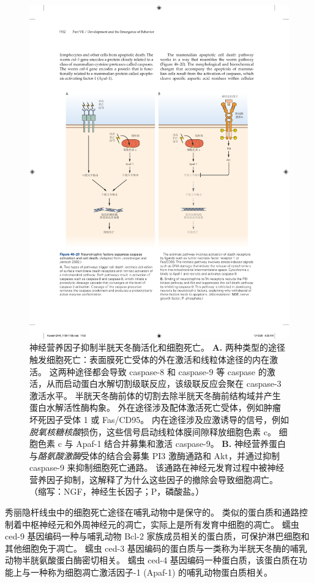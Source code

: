 \begin{figure}[htbp]
	\centering
	\includegraphics[width=0.9\linewidth]{chap46/fig_46_20}
	\caption{神经营养因子抑制半胱天冬酶活化和细胞死亡\cite{jesenberger2002deadly}。
		\textbf{A.} 两种类型的途径触发细胞死亡：表面膜死亡受体的外在激活和线粒体途径的内在激活。
		这两种途径都会导致 caspase-8 和 caspase-9 等 caspase 的激活，从而启动蛋白水解切割级联反应，该级联反应会聚在 caspase-3 激活水平。
		半胱天冬酶前体的切割去除半胱天冬酶前结构域并产生蛋白水解活性酶构象。
		外在途径涉及配体激活死亡受体，例如肿瘤坏死因子受体 1 或 Fas/CD95。
		内在途径涉及应激诱导的信号，例如\textit{脱氧核糖核酸}损伤，这些信号启动线粒体膜间隙释放细胞色素 c。
		细胞色素 c 与 Apaf-1 结合并募集和激活 caspase-9。
		\textbf{B.} 神经营养蛋白与\textit{酪氨酸激酶}受体的结合会募集 PI3 激酶通路和 Akt，并通过抑制 caspase-9 来抑制细胞死亡通路。
		该通路在神经元发育过程中被神经营养因子抑制，这解释了为什么这些因子的撤除会导致细胞凋亡。
		（缩写：NGF，神经生长因子；P，磷酸盐。）}
	\label{fig:46_20}
\end{figure}


秀丽隐杆线虫中的细胞死亡途径在哺乳动物中是保守的。
类似的蛋白质和通路控制着中枢神经元和外周神经元的凋亡，实际上是所有发育中细胞的凋亡。
蠕虫 ced-9 基因编码一种与哺乳动物 Bcl-2 家族成员相关的蛋白质，可保护淋巴细胞和其他细胞免于凋亡。 蠕虫 ced-3 基因编码的蛋白质与一类称为半胱天冬酶的哺乳动物半胱氨酸蛋白酶密切相关。
蠕虫 ced-4 基因编码一种蛋白质，该蛋白质在功能上与一种称为细胞凋亡激活因子-1 (Apaf-1) 的哺乳动物蛋白质相关。


